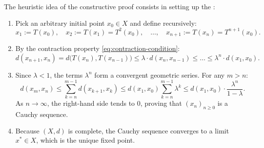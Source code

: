 \begin{content}
\begin{center}
\end{center}

\begin{steps}
The heuristic idea of the constructive proof consists in setting up the :
\begin{enumerate}[label=\textbf{(\arabic*)}]
    \setcounter{enumi}{0}
    \item Pick an arbitrary initial point $x_0 \in X$ and define recursively:
    \[
    x_1 := T(x_0), \quad x_2 := T(x_1) = T^2(x_0), \quad \dots, \quad x_{n+1} := T(x_n) = T^{n+1}(x_0).
    \]
    \item By the contraction property \eqref{eq:contraction-condition}:
    \[
    d(x_{n+1}, x_n) = d\bigl(T(x_n), T(x_{n-1})\bigr) \le \lambda \cdot d(x_n, x_{n-1}) \le \dots \le \lambda^n \cdot d(x_1, x_0).
    \]
    \item Since $\lambda < 1$, the terms $\lambda^n$ form a convergent geometric series. For any $m > n$:
    \[
    d(x_m, x_n) \le \sum_{k=n}^{m-1} d(x_{k+1}, x_k) \le d(x_1, x_0) \sum_{k=n}^{m-1} \lambda^k \le d(x_1, x_0) \cdot \frac{\lambda^n}{1 - \lambda}.
    \]
    As $n \to \infty$, the right-hand side tends to $0$, proving that $(x_n)_{n \ge 0}$ is a Cauchy sequence.
    \item Because $(X, d)$ is complete, the Cauchy sequence converges to a limit $x^* \in X$, which is the unique fixed point.
\end{enumerate}
\end{steps}
\end{content}


